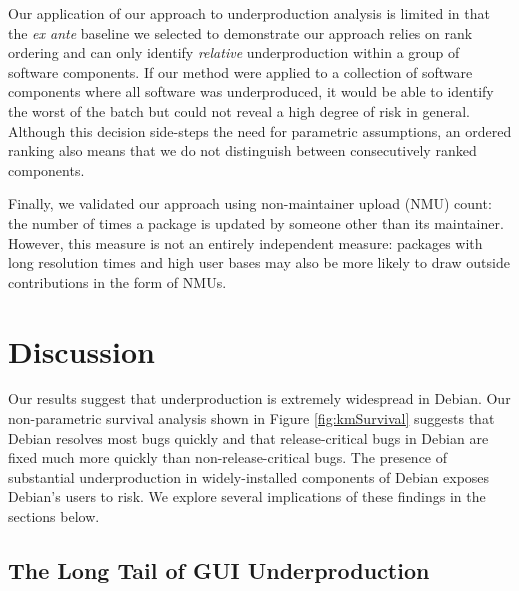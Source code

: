 \documentclass[10pt,conference]{IEEEtran}\usepackage[]{graphicx}\usepackage[usenames,dvipsnames]{color}
\begin{document}
Our application of our approach to underproduction analysis is limited in that 
the \textit{ex ante} baseline we selected to demonstrate our approach relies on rank ordering and can only identify \textit{relative} underproduction within a group of software components. 
If our method were applied to a collection of software components where all software was underproduced, it would be able to identify the worst of the batch but could not reveal a high degree of risk in general.
Although this decision side-steps the need for parametric assumptions, an ordered ranking also means that we do not distinguish between consecutively ranked components.

Finally, we validated our approach using non-maintainer upload (NMU) count: the number of times a package is updated by someone other than its maintainer. However, this measure is not an entirely independent measure: packages with long resolution times and high user bases may also be more likely to draw outside contributions in the form of NMUs. 

\section{Discussion}
\label{sec:discussion}

Our results suggest that underproduction is extremely widespread in Debian.
Our non-parametric survival analysis shown in Figure \ref{fig:kmSurvival} suggests that Debian resolves most bugs quickly and that release-critical bugs in Debian are fixed much more quickly than non-release-critical bugs. The presence of substantial underproduction in widely-installed components of Debian 
exposes Debian's users to risk.  We explore several implications of these findings in the sections below.

\subsection{The Long Tail of GUI Underproduction}
\end{document}
